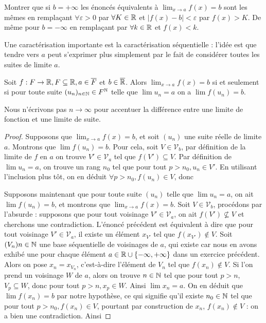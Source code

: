 \begin{exo}
    Montrer que si $b = +\infty$ les énoncés équivalents à $\displaystyle{\lim_{x\to a} f(x) = b}$ sont les mêmes en remplaçant $\forall \varepsilon > 0$ par $\forall K\in \mathbb{R}$ et $|f(x)-b| < \varepsilon$ par $f(x) > K$. De même pour $b=-\infty$ en remplaçant par $\forall k \in\mathbb{R}$ et $f(x) < k$.
\end{exo}

Une caractérisation importante est la caractérisation séquentielle : l'idée est que \og tendre vers $a$\fg{} peut s'exprimer plus simplement par le fait de considérer toutes les suites de limite $a$.

\begin{prop}
    Soit $f : F\to\mathbb{R},F\subseteq \mathbb{R}, a\in\overline F$ et $b\in\overline{\mathbb{R}}$. Alors $\displaystyle{\lim_{x\to a} f(x) = b}$ si et seulement si pour toute suite $(u_n)_{n\in\mathbb{N}}\in F^{\mathbb{N}}$ telle que $\lim u_n = a$ on a $\lim f(u_n) = b$.
\end{prop}

\begin{rmk}
    Nous n'écrivons pas $n\to\infty$ pour accentuer la différence entre une limite de fonction et une limite de suite.
\end{rmk}

\begin{proof}
    Supposons que $\displaystyle{\lim_{x\to a} f(x) = b}$, et soit $(u_n)$ une suite réelle de limite $a$. Montrons que $\lim f(u_n) = b$. Pour cela, soit $V\in\mathcal V_b$, par définition de la limite de $f$ en $a$ on trouve $V'\in\mathcal V_a$ tel que $f(V')\subseteq V$. Par définition de $\lim u_n = a$, on trouve un rang $n_0$ tel que pour tout $p > n_0, u_n\in V'$. En utilisant l'inclusion plus tôt, on en déduit $\forall p > n_0, f(u_n)\in V$, donc 

    Supposons maintenant que pour toute suite $(u_n)$ telle que $\lim u_n = a$, on ait $\lim f(u_n) = b$, et montrons que $\displaystyle{\lim_{x\to a} f(x) = b}$. Soit $V\in\mathcal V_b$, procédons par l'absurde : supposons que pour tout voisinage $V'\in\mathcal V_a$, on ait $f(V')\nsubseteq V$ et cherchons une contradiction. L'énoncé précédent est équivalent à dire que pour tout voisinage $V'\in\mathcal V_a$, il existe un élément $x_{V'}$ tel que $f(x_{V'})\notin V$. Soit $(V_n){n\in\mathbb{N}}$ une base séquentielle de voisinages de $a$, qui existe car nous en avons exhibé une pour chaque élément $a\in\mathbb{R}\cup\{-\infty,+\infty\}$ dans un exercice précédent. Alors on pose $x_n = x_{V_n}$, c'est-à-dire l'élément de $V_n$ tel que $f(x_n)\notin V$. Si l'on prend un voisinage $W$ de $a$, alors on trouve $n\in\mathbb{N}$ tel que pour tout $p > n$, $V_p\subseteq W$, donc pour tout $p > n, x_p \in W$. Ainsi $\lim x_n = a$. On en déduit que $\lim f(x_n) = b$ par notre hypothèse, ce qui signifie qu'il existe $n_0\in\mathbb{N}$ tel que pour tout $p > n_0, f(x_n)\in V$, pourtant par construction de $x_n$, $f(x_n)\notin V$ : on a bien une contradiction. Ainsi 
\end{proof}

